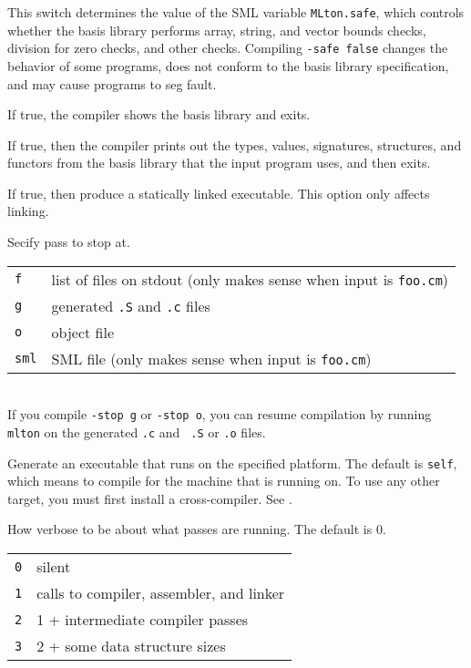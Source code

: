 \begin{description}
This switch determines the value of the SML variable {\tt MLton.safe},
which controls whether the basis library performs array, string, and
vector bounds checks, division for zero checks, and other checks.
Compiling {\tt -safe false} changes the behavior of some programs,
does not conform to the basis library specification, and may cause
programs to seg fault.

If true, the compiler shows the basis library and exits.

If true, then the compiler prints out the types, values, signatures,
structures, and functors from the basis library that the input program
uses, and then exits.

If true, then produce a statically linked executable.  This option
only affects linking.

Secify pass to stop at.\\
\begin{tabular}{ll}
{\tt f} & list of files on stdout (only makes sense when input is {\tt foo.cm})\\
{\tt g} & generated {\tt .S} and {\tt .c} files\\
{\tt o} & object file\\
{\tt sml} & SML file (only makes sense when input is {\tt foo.cm})\\
\end{tabular}\\
If you compile {\tt -stop g} or {\tt -stop o}, you can resume
compilation by running {\tt mlton} on the generated {\tt .c} and {\tt
.S} or {\tt .o} files. 

Generate an executable that runs on the specified platform.  The default
is {\tt self}, which means to compile for the machine that {\mlton} is
running on.  To use any other target, you must first install a
cross-compiler.  See .

How verbose to be about what passes are running.  The default is 0.\\
\begin{tabular}{ll}
{\tt 0} & silent\\
{\tt 1} & calls to compiler, assembler, and linker\\
{\tt 2} & 1 + intermediate compiler passes\\
{\tt 3} & 2 + some data structure sizes\\
\end{tabular}\\

\end{description}


